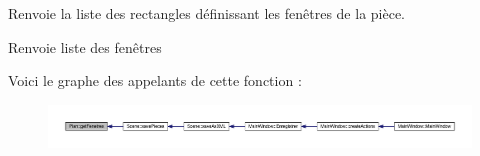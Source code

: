 Renvoie la liste des rectangles définissant les fenêtres de la pièce. 

\begin{DoxyReturn}{Renvoie}
liste des fenêtres 
\end{DoxyReturn}


Voici le graphe des appelants de cette fonction \+:
\nopagebreak
\begin{figure}[H]
\begin{center}
\leavevmode
\includegraphics[width=350pt]{class_plan_ac193f6297c584d43977dca3a16f18180_icgraph}
\end{center}
\end{figure}




